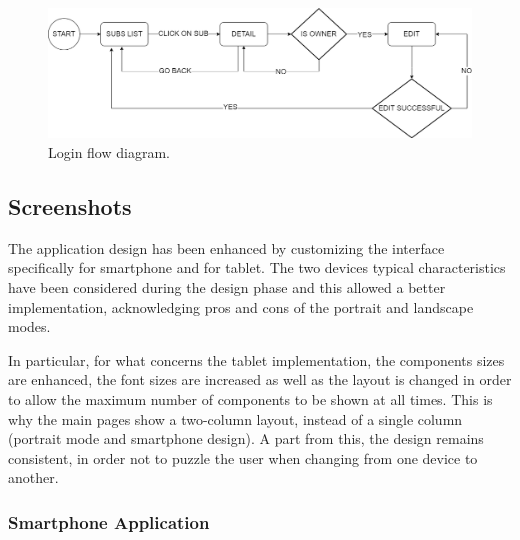 \documentclass[11pt]{article}
\begin{document}
\begin{figure}[h!]
    \begin{center}
        \includegraphics[width=\textwidth, clip]{../../assets/editflow.png}
    \end{center}
    \caption{Login flow diagram.}
    \label{fig:editflow}
\end{figure}


\subsection{Screenshots}
The application design has been enhanced by customizing the interface specifically for smartphone and for tablet. The two devices typical characteristics have been considered during the design phase and this allowed a better implementation, acknowledging pros and cons of the portrait and landscape modes.

In particular, for what concerns the tablet implementation, the components sizes are enhanced, the font sizes are increased as well as the layout is changed in order to allow the maximum number of components to be shown at all times. This is why the main pages show a two-column layout, instead of a single column (portrait mode and smartphone design). A part from this, the design remains consistent, in order not to puzzle the user when changing from one device to another.

\subsubsection{Smartphone Application}
\end{document}
